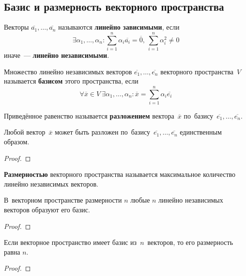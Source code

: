 \subsection{Базис и размерность векторного пространства}
Векторы $\overline{a_1}, \ldots, \overline{a_n}$ называются \textbf{линейно зависимыми}, если
\begin{equation*}
\exists \alpha_1, \ldots, \alpha_n \colon
\sum_{i=1}^n \alpha_i \overline{a_i} = \overline 0, \ 
\sum_{i=1}^n \alpha_i^2 \neq 0
\end{equation*}
иначе~--- \textbf{линейно независимыми}.

Множество линейно независимых векторов $\overline{e_1}, \ldots, \overline{e_n}$ векторного пространства~$V$ называется \textbf{базисом} этого пространства, если
\begin{equation*}
\forall \overline x \in V \ 
\exists \alpha_1, \ldots, \alpha_n \colon
\overline x = \sum_{i=1}^n \alpha_i \overline{e_i}
\end{equation*}

Приведённое равенство называется \textbf{разложением} вектора~$\overline x$ по~базису~$\overline{e_1}, \ldots, \overline{e_n}$.

\begin{theorem}
Любой вектор~$\overline x$ может быть разложен по~базису~$\overline{e_1}, \ldots, \overline{e_n}$ единственным образом.
\end{theorem}
\begin{proof}

\end{proof}

\textbf{Размерностью} векторного пространства называется максимальное количество линейно независимых векторов.

\begin{theorem}
В~векторном пространстве размерности $n$ любые $n$ линейно независимых векторов образуют его базис.
\end{theorem}
\begin{proof}

\end{proof}

\begin{theorem}
Если векторное пространство имеет базис из~$n$~векторов, то его размерность равна $n$.
\end{theorem}
\begin{proof}

\end{proof}